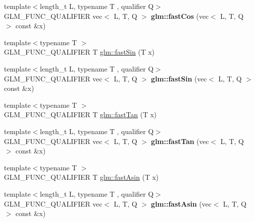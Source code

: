 \begin{DoxyCompactItemize}
\mbox{\label{fast__trigonometry_8inl_a3a4a9ffb43805a0d99dc508beeeaf4be}} 
{\footnotesize template$<$length\+\_\+t L, typename T , qualifier Q$>$ }\\G\+L\+M\+\_\+\+F\+U\+N\+C\+\_\+\+Q\+U\+A\+L\+I\+F\+I\+ER vec$<$ L, T, Q $>$ {\bfseries glm\+::fast\+Cos} (vec$<$ L, T, Q $>$ const \&x)
\item 
{\footnotesize template$<$typename T $>$ }\\G\+L\+M\+\_\+\+F\+U\+N\+C\+\_\+\+Q\+U\+A\+L\+I\+F\+I\+ER T \hyperlink{group__gtx__fast__trigonometry_ga0aab3257bb3b628d10a1e0483e2c6915}{glm\+::fast\+Sin} (T x)
\item 
\mbox{\label{fast__trigonometry_8inl_a096bd67e1f2c815e9398d960fef0df83}} 
{\footnotesize template$<$length\+\_\+t L, typename T , qualifier Q$>$ }\\G\+L\+M\+\_\+\+F\+U\+N\+C\+\_\+\+Q\+U\+A\+L\+I\+F\+I\+ER vec$<$ L, T, Q $>$ {\bfseries glm\+::fast\+Sin} (vec$<$ L, T, Q $>$ const \&x)
\item 
{\footnotesize template$<$typename T $>$ }\\G\+L\+M\+\_\+\+F\+U\+N\+C\+\_\+\+Q\+U\+A\+L\+I\+F\+I\+ER T \hyperlink{group__gtx__fast__trigonometry_gaf29b9c1101a10007b4f79ee89df27ba2}{glm\+::fast\+Tan} (T x)
\item 
\mbox{\label{fast__trigonometry_8inl_ab77424475017f729a5b8a97c2eb9d0d1}} 
{\footnotesize template$<$length\+\_\+t L, typename T , qualifier Q$>$ }\\G\+L\+M\+\_\+\+F\+U\+N\+C\+\_\+\+Q\+U\+A\+L\+I\+F\+I\+ER vec$<$ L, T, Q $>$ {\bfseries glm\+::fast\+Tan} (vec$<$ L, T, Q $>$ const \&x)
\item 
{\footnotesize template$<$typename T $>$ }\\G\+L\+M\+\_\+\+F\+U\+N\+C\+\_\+\+Q\+U\+A\+L\+I\+F\+I\+ER T \hyperlink{group__gtx__fast__trigonometry_ga562cb62c51fbfe7fac7db0bce706b81f}{glm\+::fast\+Asin} (T x)
\item 
\mbox{\label{fast__trigonometry_8inl_ab68197620bdf27dda884e87d5bc588f0}} 
{\footnotesize template$<$length\+\_\+t L, typename T , qualifier Q$>$ }\\G\+L\+M\+\_\+\+F\+U\+N\+C\+\_\+\+Q\+U\+A\+L\+I\+F\+I\+ER vec$<$ L, T, Q $>$ {\bfseries glm\+::fast\+Asin} (vec$<$ L, T, Q $>$ const \&x)
\item 

\end{DoxyCompactItemize}
